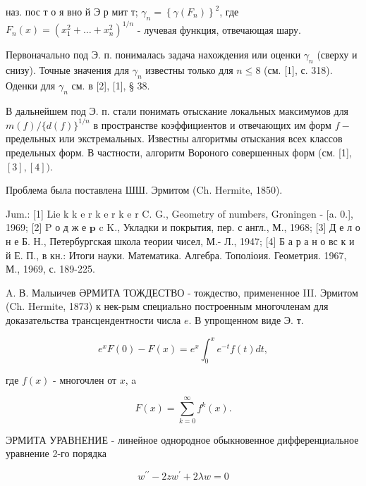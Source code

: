 \documentclass[10pt]{article}
\begin{document}
наз. пос т о я вно й Э р мит т; $\gamma_{n}=\left\{\gamma\left(F_{n}\right)\right\}^{2}$, где $F_{n}(x)=\left(x_{1}^{2}+\ldots+x_{n}^{2}\right)^{1 / n}$ - лучевая функция, отвечающая шару.



Первоначально под Э. п. понималась задача нахождения или оценки $\gamma_{n}$ (сверху и снизу). Точные значения для $\gamma_{n}$ известны только для $n \leqslant 8$ (см. [1], с. 318). Оденки для $\gamma_{n}$ см. в [2], [1], § 38.



В дальнейшем под Э. п. стали понимать отыскание локальных максимумов для $m(f) /\{d(f)\}^{1 / n}$ в пространстве коэффициентов и отвечающих им форм $f-$ предельных или экстремальных. Известны алгоритмы отыскания всех классов предельных форм. В частности, алгоритм Вороного совершенных форм (см. [1], $[3],[4])$.



Проблема была поставлена ШШ. Эрмитом (Ch. Hermite, 1850).



Jum.: [1] Lie k k e r k e r k e r C. G., Geometry of numbers, Groningen - [a. 0.], 1969; [2] P о д ж е $\mathbf{p}$ c K., Укладки и покрытия, пер. с англ., М., 1968; [3] Д е л о н е Б. Н., Петербургская школа теории чисел, М.- Л., 1947; [4] Б а р а н о вс к и й Е. П., в кн.: Итоги науки. Математика. Алгебра. Тополіоия. Геометрия. 1967, М., 1969, с. 189-225.



A. В. Малыичев ӘРМИТА ТОЖДЕСТВО - тождество, примененное III. Эрмитом (Ch. Hermite, 1873) к нек-рым специально построенным многочленам для доказательства трансцендентности числа $e$. В упрощенном виде Э. т.



\[

e^{x} F(0)-F(x)=e^{x} \int_{0}^{x} e^{-t} f(t) d t,

\]



где $f(x)$ - многочлен от $x$, a



\[

F(x)=\sum_{k=0}^{\infty} f^{k}(x) .

\]



ЭРМИТА УРАВНЕНИЕ - линейное однородное обыкновенное дифференциальное уравнение 2-го порядка



\[

w^{\prime \prime}-2 z w^{\prime}+2 \lambda w=0

\]
\end{document}
